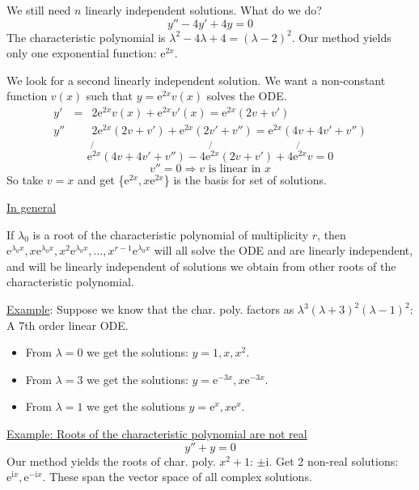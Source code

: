 \documentclass{article}
\newcommand{\mathe}{\mathrm{e}}
\newcommand{\mathi}{\mathrm{i}}
\begin{document}
We still need $n$ linearly independent solutions. What do we do?
\[ y'' - 4 y' + 4 y = 0 \]
The characteristic polynomial is $\lambda^2 - 4 \lambda + 4 = (\lambda -
2)^2$. Our method yields only one exponential function: $\mathe^{2 x}$.

We look for a second linearly independent solution. We want a non-constant
function $v (x)$ such that $y = \mathe^{2 x} v (x)$ solves the ODE.
\begin{eqnarray*}
  y' & = & 2 \mathe^{2 x} v (x) + \mathe^{2 x} v' (x) = \mathe^{2 x}  (2 v +
  v')\\
  y'' &  & 2 \mathe^{2 x}  (2 v + v') + \mathe^{2 x}  (2 v' + v'') = \mathe^{2
  x}  (4 v + 4 v' + v'')
\end{eqnarray*}
\[ \not{\mathe^{2 x}}  (4 v + 4 v' + v'') - 4 \not{\mathe^{2 x}}  (2 v + v') +
   4 \not{\mathe^{2 x}} v = 0 \]
\[ v'' = 0 \Rightarrow v \text{ is linear in } x \]
So take $v = x$ and get  \{$\mathe^{2 x}, x \mathe^{2 x}$\}  is the basis for
set of solutions.

\begin{tmornamented}[roundcorner=0pt]
  {\underline{In general}}
  
  If $\lambda_0$ is a root of the characteristic polynomial of multiplicity
  $r$, then ${\mathe^{\lambda_0 x}, x \mathe^{\lambda_0 x}, x^2
  \mathe^{\lambda_0 x}, \ldots, x^{r - 1} \mathe^{\lambda_0 x}}$ will all
  solve the ODE and are linearly independent, and will be linearly independent
  of solutions we obtain from other roots of the characteristic polynomial.
\end{tmornamented}

{\underline{Example}}: Suppose we know that the char. poly. factors as
$\lambda^3  (\lambda + 3)^2  (\lambda - 1)^2$: A 7th order linear ODE.
\begin{itemize}
  \item From $\lambda = 0$ we get the solutions: $y = 1, x, x^2$.
  
  \item From $\lambda = 3$ we get the solutions: $y = \mathe^{- 3 x}, x
  \mathe^{- 3 x}$.
  
  \item From $\lambda = 1$ we get the solutions $y = \mathe^x, x \mathe^x$.
\end{itemize}
{\underline{Example: Roots of the characteristic polynomial are not real}}
\[ y'' + y = 0 \]
Our method yields the roots of char. poly. $x^2 + 1$: $\pm \mathi$. Get 2
non-real solutions: $\mathe^{\mathi x}, \mathe^{- \mathi x}$. These span the
vector space of all complex solutions.
\end{document}
